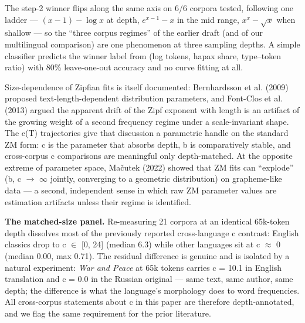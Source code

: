 \documentclass[11pt]{article}
\begin{document}
The step-2 winner flips along the same axis on 6/6 corpora tested, following one ladder --- $(x-1)-\log x$ at depth, $e^{x-1}-x$ in the mid range, $x^{x}-\sqrt{x}$ when shallow --- so the ``three corpus regimes'' of the earlier draft (and of our multilingual comparison) are one phenomenon at three sampling depths. A simple classifier predicts the winner label from (log tokens, hapax share, type--token ratio) with 80\% leave-one-out accuracy and no curve fitting at all.

Size-dependence of Zipfian fits is itself documented: Bernhardsson et al. (2009) proposed text-length-dependent distribution parameters, and Font-Clos et al. (2013) argued the apparent drift of the Zipf exponent with length is an artifact of the growing weight of a second frequency regime under a scale-invariant shape. The c(T) trajectories give that discussion a parametric handle on the standard ZM form: c is the parameter that absorbs depth, b is comparatively stable, and cross-corpus c comparisons are meaningful only depth-matched. At the opposite extreme of parameter space, Mačutek (2022) showed that ZM fits can ``explode'' (b, c $\to$ $\infty$ jointly, converging to a geometric distribution) on grapheme-like data --- a second, independent sense in which raw ZM parameter values are estimation artifacts unless their regime is identified.

\textbf{The matched-size panel.} Re-measuring 21 corpora at an identical 65k-token depth dissolves most of the previously reported cross-language c contrast: English classics drop to c $\in$ [0, 24] (median 6.3) while other languages sit at c $\approx$ 0 (median 0.00, max 0.71). The residual difference is genuine and is isolated by a natural experiment: \emph{War and Peace} at 65k tokens carries c = 10.1 in English translation and c = 0.0 in the Russian original --- same text, same author, same depth; the difference is what the language's morphology does to word frequencies. All cross-corpus statements about c in this paper are therefore depth-annotated, and we flag the same requirement for the prior literature.
\end{document}
